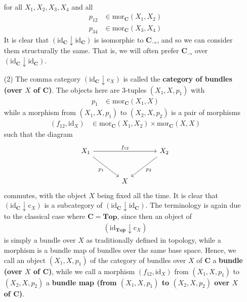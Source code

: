 \begin{enumerate}
\begin{align*}
\end{align*}
for all $X_{1},X_{2},X_{3},X_{4}$ and all
\begin{align*}
  p_{12}
  &\in
  \mathrm{mor}_{\mathbf{C}}(X_{1},X_{2})
  \\
  p_{34}
  &\in
  \mathrm{mor}_{\mathbf{C}}(X_{3},X_{4})
\end{align*}
It is clear that $(\mathrm{id}_{\mathbf{C}} \downarrow \mathrm{id}_{\mathbf{C}})$ is isomorphic to $\mathbf{C}_{\rightarrow}$, and so we can consider them structurally the same.
That is, we will often prefer $\mathbf{C}_{\rightarrow}$ over $(\mathrm{id}_{\mathbf{C}} \downarrow \mathrm{id}_{\mathbf{C}})$.
\item[(2)]
The comma category $(\mathrm{id}_{\mathbf{C}} \downarrow \mathrm{c}_{X})$ is called the \textbf{category of bundles (over $X$ of $\mathbf{C}$)}.
The objects here are $3$-tuples $(X_{1},X,p_{1})$ with
\begin{align*}
  p_{1}
  &\in
  \mathrm{mor}_{\mathbf{C}}(X_{1},X)
\end{align*}
while a morphism from $(X_{1},X,p_{1})$ to $(X_{2},X,p_{2})$ is a pair of morphisms
\begin{align*}
  (f_{12},\mathrm{id}_{X})
  &\in
  \mathrm{mor}_{\mathbf{C}}(X_{1},X_{2})
  \times
  \mathrm{mor}_{\mathbf{C}}(X,X)
\end{align*}
such that the diagram
\[
\begin{tikzcd}[sep=large]
  X_{1}
  \arrow{rr}{f_{12}}
  \arrow[swap]{dr}{p_{1}}
  &
  &
  X_{2}
  \arrow{dl}{p_{2}}
  \\
  &
  X
  &
\end{tikzcd}
\]
commutes, with the object $X$ being fixed all the time.
It is clear that $(\mathrm{id}_{\mathbf{C}} \downarrow \mathrm{c}_{X})$ is a subcategory of $(\mathrm{id}_{\mathbf{C}} \downarrow \mathrm{id}_{\mathbf{C}})$.
The terminology is again due to the classical case where $\mathbf{C} = \mathbf{Top}$, since then an object of
\begin{align*}
  (\mathrm{id}_{\mathbf{Top}} \downarrow \mathrm{c}_{X})
\end{align*}
is simply a bundle over $X$ as traditionally defined in topology, while a morphism is a bundle map of bundles over the same base space.
Hence, we call an object $(X_{1},X,p_{1})$ of the category of bundles over $X$ of $\mathbf{C}$ a \textbf{bundle (over $X$ of $\mathbf{C}$)}, while we call a morphism $(f_{12},\mathrm{id}_{X})$ from $(X_{1},X,p_{1})$ to $(X_{2},X,p_{2})$ a \textbf{bundle map (from $(X_{1},X,p_{1})$ to $(X_{2},X,p_{2})$ over $X$ of $\mathbf{C}$)}.

\end{enumerate}
